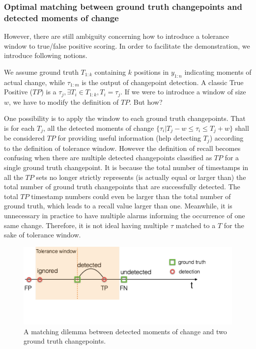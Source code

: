 \subsubsection{Optimal matching between ground truth changepoints and detected moments of change}
However, there are still ambiguity concerning how to introduce a tolerance window to true/false positive scoring.
In order to facilitate the demonstration, we introduce following notions.

We assume ground truth $T_{1:k}$ containing $k$ positions in $y_{1:n}$ indicating moments of actual change, while $\tau_{1:m}$ is the output of changepoint detection.
A classic True Positive ($TP$) is a $\tau_j, \exists T_i \in T_{1:k}, T_i = \tau_j$.
If we were to introduce a window of size $w$, we have to modify the definition of $TP$. But how?

One possibility is to apply the window to each ground truth changepoints.
That is for each $T_j$, all the detected moments of change $\{\tau_i | T_j - w \leq \tau_i \leq T_j + w \}$ shall be considered $TP$ for providing useful information (help detecting $T_j$) according to the definition of tolerance window.
However the definition of recall becomes confusing when there are multiple detected changepoints classified as $TP$ for a single ground truth changepoint.
It is because the total number of timestamps in all the $TP$ sets no longer strictly represents (is actually equal or larger than) the total number of ground truth changepoints that are successfully detected.
The total $TP$ timestamp numbers could even be larger than the total number of ground truth, which leads to a recall value larger than one.
Meanwhile, it is unnecessary in practice to have multiple alarms informing the occurrence of one same change.
Therefore, it is not ideal having multiple $\tau$ matched to a $T$ for the sake of tolerance window.

\begin{figure}[!htb]
\centering
\includegraphics[width=.95\textwidth]{gfx/chap4/matching_dilemma.pdf}
\caption{A matching dilemma between detected moments of change and two ground truth changepoints.}
\label{fig:matching_dilemma}
\end{figure}

